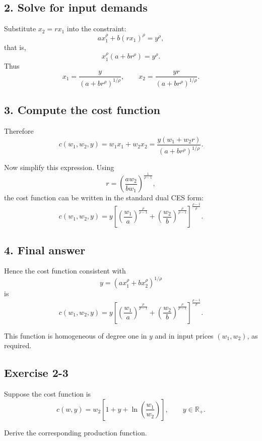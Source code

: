 \subsection*{2. Solve for input demands}

Substitute \(x_2=rx_1\) into the constraint:
\[
a x_1^\rho+b(rx_1)^\rho=y^\rho,
\]
that is,
\[
x_1^\rho(a+b r^\rho)=y^\rho.
\]
Thus
\[
x_1=\frac{y}{(a+b r^\rho)^{1/\rho}},
\qquad
x_2=\frac{yr}{(a+b r^\rho)^{1/\rho}}.
\]

\subsection*{3. Compute the cost function}

Therefore
\[
c(w_1,w_2,y)=w_1x_1+w_2x_2
=
\frac{y(w_1+w_2 r)}{(a+b r^\rho)^{1/\rho}}.
\]

Now simplify this expression. Using
\[
r=\left(\frac{a w_2}{b w_1}\right)^{\frac{1}{\rho-1}},
\]
the cost function can be written in the standard dual CES form:
\[
\boxed{
c(w_1,w_2,y)
=
y
\left[
\left(\frac{w_1}{a}\right)^{\frac{\rho}{\rho-1}}
+
\left(\frac{w_2}{b}\right)^{\frac{\rho}{\rho-1}}
\right]^{\frac{\rho-1}{\rho}}.
}
\]

\subsection*{4. Final answer}

Hence the cost function consistent with
\[
y=\left(a x_1^\rho+b x_2^\rho\right)^{1/\rho}
\]
is
\[
\boxed{
c(w_1,w_2,y)
=
y
\left[
\left(\frac{w_1}{a}\right)^{\frac{\rho}{\rho-1}}
+
\left(\frac{w_2}{b}\right)^{\frac{\rho}{\rho-1}}
\right]^{\frac{\rho-1}{\rho}}.
}
\]

This function is homogeneous of degree one in \(y\) and in input prices \((w_1,w_2)\), as required.




\vspace{30pt}
\begin{tcolorbox}[breakable]

\subsection*{Exercise 2-3}

Suppose the cost function is
\[
c(w,y)=w_2\left[1+y+\ln\left(\frac{w_1}{w_2}\right)\right],
\qquad y \in \mathbb{R}_+.
\]

Derive the corresponding production function.

\end{tcolorbox}

